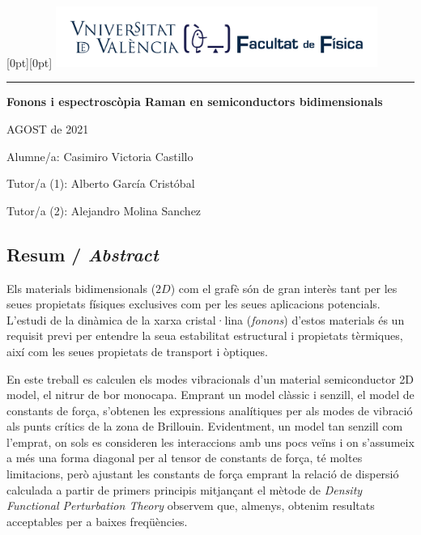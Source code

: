 \documentclass[12pt]{article} %
\author{Casimiro Victoria Castillo}
\begin{document}
\begin{titlepage}
   \noindent\raisebox{0pt}[0pt][0pt]{
	\includegraphics[width=10.5cm]{./portada-TFG-LaTeX/marca-Facultat-Fisica-UV-1-linia.pdf}}\par
   \vspace{8.5cm}
   {\centering
      \par
      \rule{16.13cm}{1.5pt}\par
      \vspace{4.5cm}
      {\bfseries\sffamily\LARGE Fonons i espectroscòpia Raman en semiconductors bidimensionals}\par
   }
   \vfill
   {\raggedleft\sffamily
		AGOST de 2021\par
      \vspace{\baselineskip}
		Alumne/a: Casimiro Victoria Castillo\par
      \vspace{\baselineskip}
		Tutor/a (1): Alberto García Cristóbal\par
		Tutor/a (2): Alejandro Molina Sanchez\par
   }
\end{titlepage}
\restoregeometry


\subsection*{Resum / \emph{Abstract}}
 
 Els materials bidimensionals ($2D$) com el grafè són de gran interès tant per les seues propietats físiques exclusives com per les seues aplicacions potencials. L'estudi de la dinàmica de la xarxa cristal·lina (\textit{fonons}) d'estos materials és un requisit previ per entendre la seua estabilitat estructural i propietats tèrmiques, així com les seues propietats de transport i òptiques. 
 
 En este treball es calculen els modes vibracionals  d'un  material semiconductor 2D model, el nitrur de bor monocapa. Emprant un model clàssic i senzill, el model de constants de força, s'obtenen les expressions analítiques per als modes de vibració als punts crítics de la zona de Brillouin. Evidentment, un model tan senzill com l'emprat, on sols es consideren les interaccions amb uns pocs veïns i on s'assumeix a més una forma diagonal per al tensor de constants de força, té moltes limitacions, però ajustant les constants de força emprant la relació de dispersió calculada a partir de primers principis mitjançant el mètode de \emph{Density Functional Perturbation Theory} observem que, almenys, obtenim resultats acceptables per a baixes freqüències.
\end{document}
